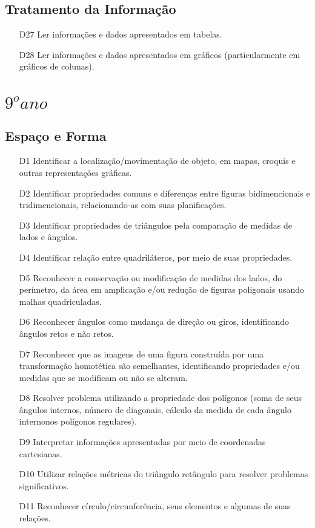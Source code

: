 \subsection{Tratamento da Informação}
\begin{enumerate}
    \item[D27] \label{itm5:D27} Ler informações e dados apresentados em tabelas.
    \item[D28] \label{itm5:D28} Ler informações e dados apresentados em gráficos (particularmente em gráficos de colunas).
\end{enumerate}

\section{$9^o ano$}
\subsection{Espaço e Forma}
\begin{enumerate}
    \item[D1] \label{itm9:D1} Identificar a localização/movimentação de objeto, em mapas, croquis e outras representações gráficas.
    \item[D2] \label{itm9:D2} Identificar propriedades comuns e diferenças entre figuras bidimencionais e tridimencionais, relacionando-as com suas planificações.
    \item[D3] \label{itm9:D3} Identificar propriedades de triângulos pela comparação de medidas de lados e ângulos.
    \item[D4] \label{itm9:D4} Identificar relação entre quadriláteros, por meio de suas propriedades.
    \item[D5] \label{itm9:D5} Reconhecer a conservação ou modificação de medidas dos lados, do perímetro, da área em amplicação e/ou redução de figuras poligonais usando malhas quadriculadas.
    \item[D6] \label{itm9:D6} Reconhecer ângulos como mudança de direção ou giros, identificando ângulos retos e não retos.
    \item[D7] \label{itm9:D7} Reconhecer que as imagens de uma figura construída por uma transformação homotética são semelhantes, identificando propriedades e/ou medidas que se modificam ou não se alteram.
    \item[D8] \label{itm9:D8} Resolver problema utilizando a propriedade dos polígonos (soma de seus ângulos internos, número de diagonais, cálculo da medida de cada ângulo internonos polígonos regulares).
    \item[D9] \label{itm9:D9} Interpretar informações apresentadas por meio de coordenadas cartesianas.
    \item[D10] \label{itm9:D10} Utilizar relações métricas do triângulo retângulo para resolver problemas significativos.
    \item[D11] \label{itm9:D11} Reconhecer círculo/circunferência, seus elementos e algumas de suas relações.
\end{enumerate}

